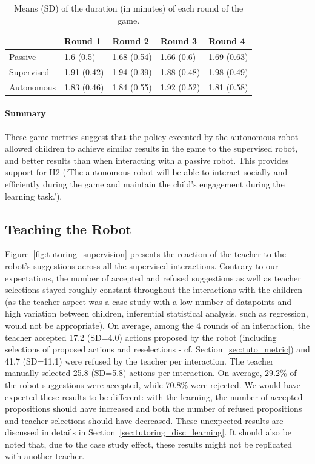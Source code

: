 \begin{table}[ht]
	\centering
	\caption{Means (SD) of the duration (in minutes) of each round of the game.}
	\label{tab:tuto_results_time}
	\begin{tabularx}{\textwidth}{@{}L{1.}L{1}L{1}L{1}L{1}@{}}\toprule
		& Round 1 & Round 2 & Round 3 & Round 4\\ 
		\midrule 
		Passive & 1.6 (0.5) & 1.68 (0.54) & 1.66 (0.6) & 1.69 (0.63)\\ 
		Supervised & 1.91 (0.42) & 1.94 (0.39) & 1.88 (0.48) & 1.98 (0.49)\\ 
		Autonomous & 1.83 (0.46) & 1.84 (0.55) & 1.92 (0.52) & 1.81 (0.58)\\ 
		
		\bottomrule
	\end{tabularx}
\end{table}

\paragraph{Summary}
These game metrics suggest that the policy executed by the autonomous robot allowed children to achieve similar results in the game to the supervised robot, and better results than when interacting with a passive robot. This provides support for H2 (`The autonomous robot will be able to interact socially and efficiently during the game and maintain the child's engagement during the learning task.'). 

\subsection{Teaching the Robot}

Figure~\ref{fig:tutoring_supervision} presents the reaction of the teacher to the robot's suggestions across all the supervised interactions. Contrary to our expectations, the number of accepted and refused suggestions as well as teacher selections stayed roughly constant throughout the interactions with the children (as the teacher aspect was a case study with a low number of datapoints and high variation between children, inferential statistical analysis, such as regression, would not be appropriate). On average, among the 4 rounds of an interaction, the teacher accepted 17.2 (SD=4.0) actions proposed by the robot (including selections of proposed actions and reselections - cf. Section~\ref{sec:tuto_metric}) and 41.7 (SD=11.1) were refused by the teacher per interaction. The teacher manually selected 25.8 (SD=5.8) actions per interaction. On average, 29.2\% of the robot suggestions were accepted, while 70.8\% were rejected. We would have expected these results to be different: with the learning, the number of accepted propositions should have increased and both the number of refused propositions and teacher selections should have decreased. These unexpected results are discussed in details in Section~\ref{sec:tutoring_disc_learning}. It should also be noted that, due to the case study effect, these results might not be replicated with another teacher.

